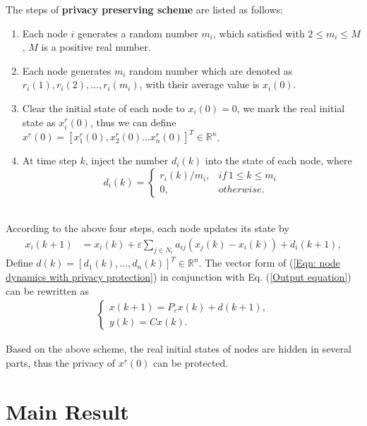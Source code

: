 \documentclass[10pt,journal,compsoc]{IEEEtran}
\begin{document}
The steps of {\bf privacy preserving scheme} are listed as follows:
\begin{enumerate}[1)]
\item Each node $i$ generates a random number $m_{i}$, which satisfied with $2\leq m_{i} \leq M$, $M$ is a positive real number.
\item Each node generates $m_{i}$ random number which are denoted as ${r_{i}(1), r_{i}(2), ..., r_{i}(m_i)}$, with their average value is $x_{i}(0)$.
\item Clear the initial state of each node to $x_{i}(0)=0$, we mark the real initial state as $x_{i}^{r}(0)$, thus we can define $x^{r}(0)=[x_{1}^{r}(0), x_{2}^{r}(0) ...x_{n}^{r}(0)]^{T}\in\mathbb{R}^{n}$.
\item At time step $k$, inject the number $d_{i}(k)$ into the state of each node, where
\[
d_{i}(k)=\begin{cases}
r_{i}(k)/m_i, & if\, 1\leq k\leq m_{i} \\
0, & otherwise.
\end{cases}
\]\\
\end{enumerate}
According to the above four steps, each node updates its state by
\begin{equation}\label{Eqn: node dynamics with privacy protection}
\begin{split}
x_{i}(k+1)&=x_{i}(k)+\varepsilon\underset{j\in N_{i}}{\sum}a_{ij}(x_{j}(k)-x_{i}(k))+d_{i}(k+1),
\end{split}
\end{equation}
Define $d(k)=[d_{1}(k), ...,d_{n}(k)]^{T}\in\mathbb{R}^{n}$. The vector form of (\ref{Eqn: node dynamics with privacy protection}) in conjunction with Eq. (\ref{Output equation}) can be rewritten as
\begin{equation}  \label{new update rule}
\begin{split}
\begin{cases}
x(k+1)=P_{\varepsilon}x(k)+d(k+1), \\
y(k)=Cx(k).
\end{cases}
\end{split}
\end{equation}

Based on the above scheme, the real initial states of nodes are hidden in several parts, thus the privacy of $x^r(0)$ can be protected.
\section{Main Result}\label{Main Result}
\end{document}
